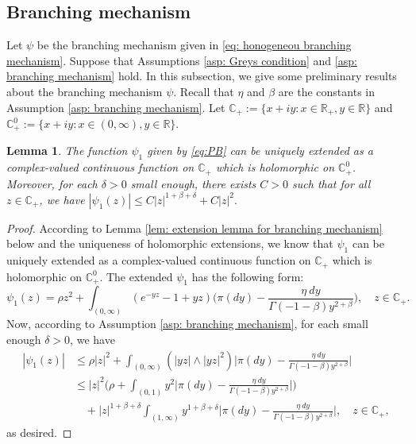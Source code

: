 \documentclass[12pt,a4paper]{amsart}
\theoremstyle{plain}
\newtheorem{lem}[thm]{Lemma}
\theoremstyle{definition}
\numberwithin{equation}{section}
\begin{document}
\subsection{Branching mechanism}
\label{sec: branching mechanism}
Let $\psi$ be the branching mechanism given in \eqref{eq: honogeneou branching mechanism}.
Suppose that Assumptions \ref{asp: Greys condition} and \ref{asp: branching mechanism} hold.
In this subsection, we give some preliminary results about the branching mechanism $\psi$.
Recall that $\eta$ and $\beta$ are the constants in Assumption \ref{asp: branching mechanism}.
Let $\mathbb C_+:= \{x+iy: x\in \mathbb R_+, y \in \mathbb R\}$ and $\mathbb C^0_+:= \{x+iy: x\in (0,\infty), y \in \mathbb R\}$.
\begin{lem}
  \label{lem:CEP}
	The function $\psi_1$ given by \eqref{eq:PB} can be uniquely extended as a complex-valued continuous function on $\mathbb C_+$ which is holomorphic on $\mathbb C^0_+$.
  Moreover, for each $\delta > 0$ small enough, there exists $C>0$ such that for all $z\in \mathbb C_+$, we have $|\psi_1(z)| \leq C |z|^{1+\beta+\delta} + C|z|^2.$
\end{lem}
\begin{proof}
  According to Lemma \ref{lem: extension lemma for branching mechanism} below and the uniqueness of holomorphic extensions, we know that $\psi_1$ can be uniquely extended as a complex-valued continuous function on $\mathbb C_+$ which is holomorphic on $\mathbb C^0_+$.
	The extended $\psi_1$ has the following form:
  \[
    \psi_1(z)
    = \rho z^2 + \int_{(0,\infty)}(e^{-yz}-1+yz) \Big(\pi(dy) - \frac {\eta~dy} {\Gamma(-1-\beta)y^{2+\beta}} \Big)
    , \quad z\in \mathbb C_+.
  \]
	Now, according to  Assumption \ref{asp: branching mechanism}, for each small enough $\delta > 0$, we have
  \begin{align}
    |\psi_1(z)|
    & \leq \rho |z|^2 + \int_{(0,\infty)} (|yz|\wedge |yz|^2) \Big|\pi(dy) - \frac{\eta~dy}{\Gamma(-1-\beta)y^{2+\beta}}\Big| \\
    & \leq  |z|^2 \Big(\rho + \int_{(0,1)} y^2 \Big|\pi(dy) - \frac{\eta~dy}{\Gamma(-1-\beta)y^{2+\beta}}\Big|\Big) \\
    & \quad + |z|^{1+\beta +\delta}\int_{(1,\infty)} y^{1+\beta + \delta} \Big|\pi(dy) - \frac{\eta~dy}{\Gamma(-1-\beta)y^{2+\beta}}\Big|,
      \quad z \in \mathbb C_+,
  \end{align}
	as desired.
\end{proof}
\end{document}

